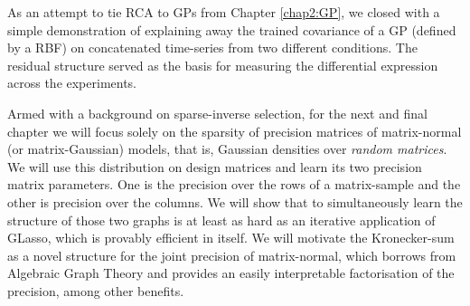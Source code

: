     As an attempt to tie RCA to GPs from Chapter \ref{chap2:GP}, we closed with a simple demonstration of explaining away the trained covariance of a GP (defined by a RBF) on concatenated time-series from two different conditions.
    The residual structure served as the basis for measuring the differential expression across the experiments.

    Armed with a background on sparse-inverse selection, for the next and final chapter we will focus solely on the sparsity of precision matrices of matrix-normal (or matrix-Gaussian) models, that is, Gaussian densities over \emph{random matrices}.
    We will use this distribution on design matrices and learn its two precision matrix parameters.
    One is the precision over the rows of a matrix-sample and the other is precision over the columns.
    We will show that to simultaneously learn the structure of those two graphs is at least as hard as an iterative application of GLasso, which is provably efficient in itself.
    We will motivate the Kronecker-sum as a novel structure for the joint precision of matrix-normal, which borrows from Algebraic Graph Theory and provides an easily interpretable factorisation of the precision, among other benefits.


